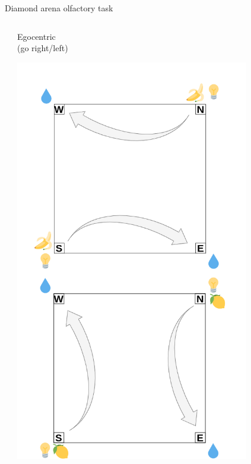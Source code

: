 \documentclass[bigger]{beamer}
\begin{document}
\begin{frame}[label={sec:org6ae2186}]{Diamond arena olfactory task}
\begin{columns}
\begin{column}[t]{0.5\columnwidth}
\begin{center}
\end{center}
\end{column}
\begin{column}[t]{0.5\columnwidth}
\center
\vspace{-2em}
Egocentric\\
(go right/left)
\vspace{-2em}
\begin{center}
\includegraphics[width=0.8\textwidth]{img/RL_env-ego-task.drawio.png}
\end{center}
\end{column}
\end{columns}
\end{frame}
\end{document}
